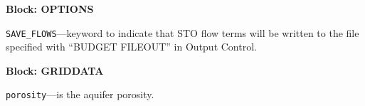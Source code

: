 
\item \textbf{Block: OPTIONS}

\begin{description}
\item \texttt{SAVE\_FLOWS}---keyword to indicate that STO flow terms will be written to the file specified with ``BUDGET FILEOUT'' in Output Control.

\end{description}
\item \textbf{Block: GRIDDATA}

\begin{description}
\item \texttt{porosity}---is the aquifer porosity.

\end{description}

